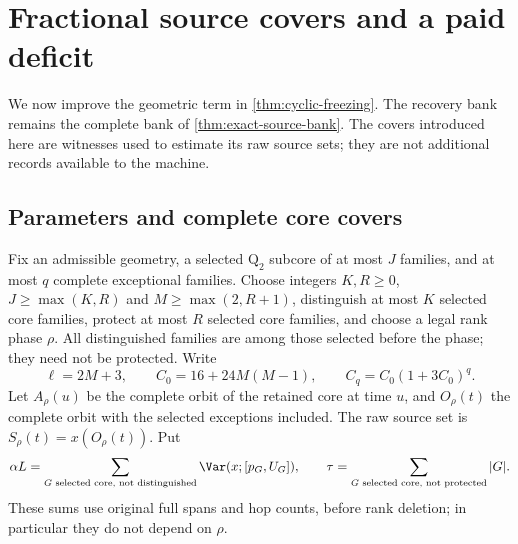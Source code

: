 \section{Fractional source covers and a paid deficit}\label{sec:source-covers}

We now improve the geometric term in \cref{thm:cyclic-freezing}.
The recovery bank remains the complete bank of \cref{thm:exact-source-bank}.
The covers introduced here are witnesses used to estimate its raw source
sets; they are not additional records available to the machine.

\subsection{Parameters and complete core covers}

Fix an admissible geometry, a selected $\mathrm Q_2$ subcore of at most $J$
families, and at most $q$ complete exceptional families. Choose integers
$K,R\ge0$, $J\ge\max(K,R)$ and $M\ge\max(2,R+1)$, distinguish at most $K$ selected
core families, protect at most $R$ selected core families, and choose a legal rank phase
$\rho$. All distinguished families are among those selected before the
phase; they need not be protected. Write
\begin{equation}\label{eq:cover-parameters}
 \ell=2M+3,\qquad C_0=16+24M(M-1),\qquad C_q=C_0(1+3C_0)^q.
\end{equation}
Let $A_\rho(u)$ be the complete orbit of the retained core at time $u$,
and $O_\rho(t)$ the complete orbit with the selected exceptions included.
The raw source set is $S_\rho(t)=x(O_\rho(t))$. Put
\begin{equation}\label{eq:alpha-tau}
 \alpha L=\sum_{G\text{ selected core, not distinguished}}
              \Var(x;[p_G,U_G]),\qquad
 \tau=\sum_{G\text{ selected core, not protected}} |G|.
\end{equation}
These sums use original full spans and hop counts, before rank deletion;
in particular they do not depend on $\rho$.

